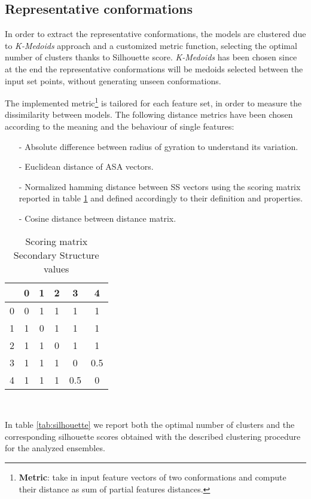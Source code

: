 \subsection{Representative conformations}
In order to extract the representative conformations, the models are clustered due to \emph{K-Medoids} approach and a customized metric function, selecting the optimal number of clusters thanks to Silhouette score.
\emph{K-Medoids} has been chosen since at the end the representative conformations will be medoids selected between the input set points, without generating unseen conformations.

\medskip
The implemented metric\footnote{\textbf{Metric}: take in input feature vectors of two conformations and compute their distance as sum of partial features distances.} is tailored for each feature set, in order to measure the dissimilarity between models. The following distance metrics have been chosen according to the meaning and the behaviour of single features:
\begin{itemize}
\item[-] Absolute difference between radius of gyration to understand its variation.
\item[-] Euclidean distance of ASA vectors.
\item[-] Normalized hamming distance between SS vectors using the scoring matrix reported in table \ref{tab:score} and defined accordingly to their definition and properties.
\item[-] Cosine distance between distance matrix.
\end{itemize}

\begin{table}[H]
\begin{center}
\begin{tabular}{c|ccccc}
& 0 & 1 & 2 & 3 & 4 \\
\hline
0 & 0 & 1 & 1 & 1 & 1\\
1 & 1 & 0 & 1 & 1 & 1\\
2 & 1 & 1 & 0 & 1 & 1\\
3 & 1 & 1 & 1 & 0 & 0.5\\
4 & 1 & 1 & 1 & 0.5 & 0\\
\end{tabular}
\end{center}
\caption{Scoring matrix Secondary Structure values}~\label{tab:score}
\end{table}

In table \ref{tab:silhouette} we report both the optimal number of clusters and the corresponding silhouette scores obtained with the described clustering procedure for the analyzed ensembles.

